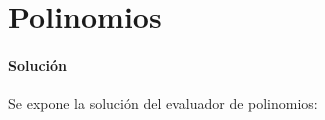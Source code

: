 \section{Polinomios}
  
  \paragraph{Solución}
  Se expone la solución del evaluador de polinomios:
  
  